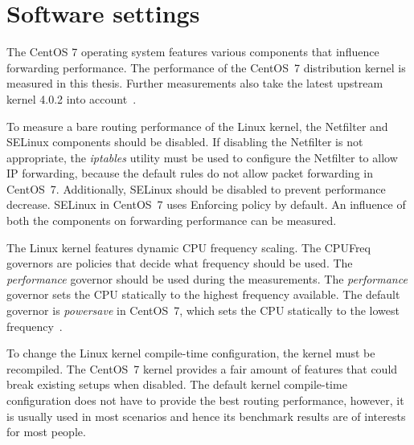 
\section{Software settings}\label{sec:analysis-settings}
The CentOS 7 operating system features various components that influence forwarding performance.
The performance of the CentOS~7 distribution kernel is measured in this thesis.
Further measurements also take the latest upstream kernel 4.0.2 into account~\cite{kernel-source}.

To measure a bare routing performance of the Linux kernel,
the Netfilter and SELinux components should be disabled.
If disabling the Netfilter is not appropriate,
the {\it{iptables}} utility must be used to configure the Netfilter to allow IP forwarding,
because the default rules do not allow packet forwarding in CentOS~7.
Additionally, SELinux should be disabled to prevent performance decrease.
SELinux in CentOS~7 uses Enforcing policy by default.
An influence of both the components on forwarding performance can be measured.

The Linux kernel features dynamic CPU frequency scaling.
The CPUFreq governors are policies that decide what frequency should be used.
The {\it{performance}} governor should be used during the measurements.
The {\it{performance}} governor sets the CPU statically to the
highest frequency available. %
The default governor is {\it{powersave}} in CentOS~7,
which sets the CPU statically to the lowest frequency~\cite{cpufreq-governors}.

To change the Linux kernel compile-time configuration, the kernel must be recompiled.
The CentOS~7 kernel provides a fair amount of features that could break existing setups when disabled.
The default kernel compile-time configuration does not have to provide the best routing performance,
however, it is usually used in most scenarios and hence its benchmark results are of interests for most people.









